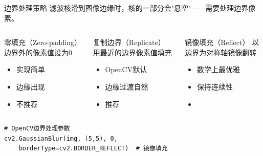 \begin{frame}[fragile]{边界处理策略}
	滤波核滑到图像边缘时，核的一部分会"悬空"——需要处理边界像素。

	\vspace{0.3cm}

	\begin{columns}
		\begin{block}{零填充（Zero-padding）}
			边界外的像素值设为0
			\begin{itemize}
				\item 实现简单
				\item 边缘出现
				\item 不推荐
			\end{itemize}
		\end{block}

		\begin{block}{复制边界（Replicate）}
			用最近的边界像素值填充
			\begin{itemize}
				\item OpenCV默认
				\item 边缘过渡自然
				\item 推荐
			\end{itemize}
		\end{block}

		\begin{block}{镜像填充（Reflect）}
			以边界为对称轴镜像翻转
			\begin{itemize}
				\item 数学上最优雅
				\item 保持连续性
				\item {}
			\end{itemize}
		\end{block}
	\end{columns}

	\vspace{0.3cm}

	\begin{lstlisting}[basicstyle=\ttfamily\small]
# OpenCV边界处理参数
cv2.GaussianBlur(img, (5,5), 0,
    borderType=cv2.BORDER_REFLECT)  # 镜像填充
	\end{lstlisting}
\end{frame}

